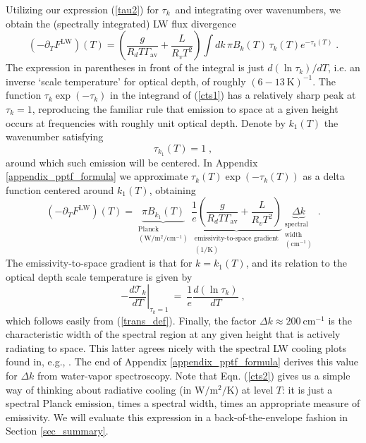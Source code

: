 \documentclass[10pt]{article}
\newcommand{\beqn}{\begin{equation}}
\newcommand{\eeqn}{\end{equation}}
\newcommand{\eqnref}[1]{(\ref{#1})}
\newcommand{\n}{\nonumber}
\newcommand{\inverse}{^{-1}}
\newcommand{\ppt}{\ensuremath{\partial_T}}
\newcommand{\FLW}{\ensuremath{F^\mathrm{LW}}}
\newcommand{\trans}{\ensuremath{\mathcal{T}}}
\newcommand{\cminverse}{\ensuremath{\mathrm{cm^{-1}}}}
\newcommand{\tauk}{\ensuremath{\tau_k}}
\newcommand{\Wmsq}{\ensuremath{\mathrm{W/m^2}}}
\newcommand{\gammaav}{\ensuremath{\Gamma_\mathrm{av}}}
\begin{document}
	 Utilizing our expression \eqnref{tau2} for \tauk\ and integrating over wavenumbers,  we obtain the (spectrally integrated) LW flux divergence
	\beqn
		(-\ppt \FLW)(T)  = \left( \frac{g}{R_dT\gammaav} + \frac{L}{R_v T^2}\right) \int dk\, \pi B_k(T)\, \tauk(T) e^{-\tauk(T)}  \; .
	\label{cts1}
	\eeqn
The expression in parentheses in front of the integral is just $d (\ln \tauk)/dT$, i.e. an inverse  `scale temperature' for optical depth, of roughly $\mathrm{(6 -13\ K)}\inverse$. The function $\tauk \exp(-\tauk)$ in the integrand of \eqnref{cts1} has a relatively sharp peak at $\tauk=1$, reproducing the familiar rule that emission to space at a given height occurs at frequencies with roughly unit optical depth. Denote by $k_1(T)$ the wavenumber satisfying 
	\beqn
		\tau_{k_1}(T)=1 \; , 
		\n
	\eeqn
	around which such emission will be centered.  In Appendix \ref{appendix_pptf_formula} we approximate $\tauk(T)\exp(-\tauk(T))$ as a delta function centered around $k_1(T)$,  obtaining
	\beqn
		(-\ppt \FLW)(T)  = \underbrace{\pi B_{k_1}(T)}_{\substack{ \text{Planck } \\ (\mathrm{W/m^2/cm^{-1}} ) } }
					    \underbrace{\frac{1}{e}\left( \frac{g}{R_dT\gammaav} + \frac{L}{R_v T^2}\right)}_{\substack{ \text{emissivity-to-space gradient}  \\ (\mathrm{1/K}) } } 
					   \underbrace{\Delta k}_{\substack{  \text{spectral} \\ \text{width} \\ \mathrm{(cm^{-1})} } }   \; .
		\label{cts2}
	\eeqn
  The emissivity-to-space gradient is that for $k=k_1(T)$, and its relation to the optical depth scale temperature is given by 
  	\beqn
		-\left.\frac{d\trans_k}{dT}\right|_{\tauk=1}\ =\ \frac{1}{e}\frac{d(\ln\tauk)}{dT} \; ,
		\n
	\eeqn
which follows easily from \eqnref{trans_def}.  Finally, the factor $\Delta k \approx 200\ \cminverse$ is the characteristic  width of the spectral region at any given height that is actively radiating to space.  This latter agrees nicely with the spectral LW cooling plots found in, e.g., \cite{huang2013,clough1992}. The end of  Appendix \ref{appendix_pptf_formula} derives this value for $\Delta k$ from water-vapor spectroscopy. 
Note that Eqn. \eqnref{cts2} gives us a simple way of thinking about  radiative cooling (in $\Wmsq/\mathrm{K}$) at level $T$: it is just a spectral Planck emission, times a spectral width,  times an appropriate measure of emissivity. We will evaluate this expression in a back-of-the-envelope fashion in Section \ref{sec_summary}.
 
\end{document}
